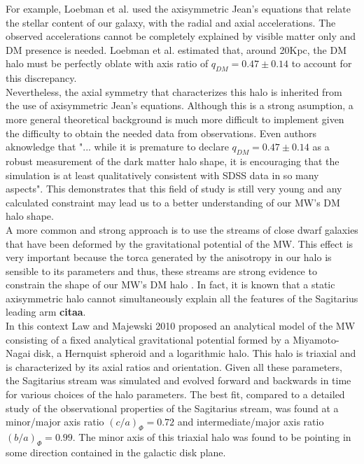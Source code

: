 For example, Loebman et al. \cite{Loebman et al 2012} used the axisymmetric Jean's equations \cite{Jean 2015} that relate the stellar content of our galaxy, with the radial and axial accelerations. 
The observed accelerations cannot be completely explained by visible matter only and DM presence is needed. Loebman et al. estimated that, around 20Kpc, the DM halo must be perfectly oblate with axis ratio of $q_{DM}=0.47 \pm 0.14$ to account for this discrepancy.\\

Nevertheless, the axial symmetry that characterizes this halo is inherited from the use of axisymmetric Jean's equations. 
Although this is a strong asumption, a more general theoretical background is much more difficult to implement given the difficulty to obtain the needed data from observations. 
Even authors aknowledge that "... while it is premature to declare $q_{DM}=0.47 \pm 0.14$ as a robust measurement of the dark matter halo shape, it is encouraging that the simulation is at least qualitatively consistent with SDSS data in so many aspects".
This demonstrates that this field of study is still very young and any calculated constraint may lead us to a better understanding of our MW's DM halo shape.\\

A more common and strong approach is to use the streams of close dwarf galaxies that have been deformed by the gravitational potential of the MW. 
This effect is very important because the torca generated by the anisotropy in our halo is sensible to its parameters and thus, these streams are strong evidence to constrain the shape of our MW's DM halo \cite{See Law-Majewski references}. 
In fact, it is known that a static axisymmetric halo cannot simultaneously explain all the features of the Sagitarius leading arm \textbf{citaa}. \\

In this context Law and Majewski 2010 proposed an analytical model of the MW consisting of a fixed analytical gravitational potential formed by a Miyamoto-Nagai \cite{Miyamoto-Nagai 1985} disk, a Hernquist spheroid and a logarithmic halo. 
This halo is triaxial and is characterized by its axial ratios and orientation. 
Given all these parameters, the Sagitarius stream was simulated and evolved forward and backwards in time for various choices of the halo parameters. 
The best fit, compared to a detailed study of the observational properties of the Sagitarius stream, was found at a minor/major axis ratio $(c/a)_{\Phi}=0.72$ and intermediate/major axis ratio $(b/a)_{\Phi}=0.99$. The minor axis of this triaxial halo was found to be pointing in some direction contained in the galactic disk plane. \\

